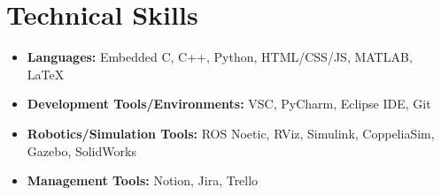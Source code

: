 \section*{Technical Skills}
%
%
%
\begin{itemize}
  \item \textbf{Languages:} Embedded C, C++, Python, HTML/CSS/JS, MATLAB, LaTeX
  \item \textbf{Development Tools/Environments:} VSC, PyCharm, Eclipse IDE, Git
  \item \textbf{Robotics/Simulation Tools:} ROS Noetic, RViz, Simulink, CoppeliaSim, Gazebo, SolidWorks
  \item \textbf{Management Tools:} Notion, Jira, Trello
\end{itemize}